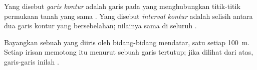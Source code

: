 \begin{definition}\label{def:g9:maps-of-the-earth:contour}
Yang disebut \emph{garis kontur} adalah garis pada
 yang menghubungkan titik-titik permukaan tanah yang sama
. Yang disebut \emph{interval kontur}
adalah selisih  antara dua garis kontur yang bersebelahan;
nilainya sama di seluruh .
\end{definition}

Bayangkan sebuah  yang diiris oleh bidang-bidang mendatar, satu
setiap \qty{100}{m}. Setiap irisan memotong  itu menurut sebuah garis
tertutup; jika dilihat dari atas, garis-garis inilah .

